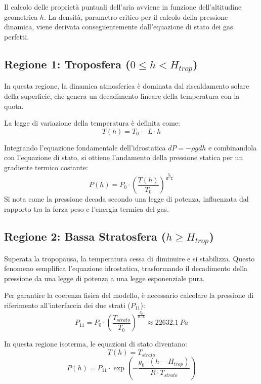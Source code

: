 \documentclass[12pt,a4paper]{article}
\begin{document}
Il calcolo delle proprietà puntuali dell'aria avviene in funzione dell'altitudine geometrica $h$. La densità, parametro critico per il calcolo della pressione dinamica, viene derivata conseguentemente dall'equazione di stato dei gas perfetti.

\subsection{Regione 1: Troposfera ($0 \le h < H_{trop}$)}
In questa regione, la dinamica atmosferica è dominata dal riscaldamento solare della superficie, che genera un decadimento lineare della temperatura con la quota. 

La legge di variazione della temperatura è definita come:
\begin{equation}
    T(h) = T_0 - L \cdot h
\end{equation}

Integrando l'equazione fondamentale dell'idrostatica $dP = -\rho g dh$ e combinandola con l'equazione di stato, si ottiene l'andamento della pressione statica per un gradiente termico costante:
\begin{equation}
    P(h) = P_0 \cdot \left( \frac{T(h)}{T_0} \right)^{\frac{g_0}{R \cdot L}}
\end{equation}
Si nota come la pressione decada secondo una legge di potenza, influenzata dal rapporto tra la forza peso e l'energia termica del gas.

\subsection{Regione 2: Bassa Stratosfera ($h \ge H_{trop}$)}
Superata la tropopausa, la temperatura cessa di diminuire e si stabilizza. Questo fenomeno semplifica l'equazione idrostatica, trasformando il decadimento della pressione da una legge di potenza a una legge esponenziale pura.

Per garantire la coerenza fisica del modello, è necessario calcolare la pressione di riferimento all'interfaccia dei due strati ($P_{11}$):
\begin{equation}
    P_{11} = P_0 \cdot \left( \frac{T_{strato}}{T_0} \right)^{\frac{g_0}{R \cdot L}} \approx \SI{22632.1}{Pa}
\end{equation}

In questa regione isoterma, le equazioni di stato diventano:
\begin{equation}
    T(h) = T_{strato}
\end{equation}
\begin{equation}
    P(h) = P_{11} \cdot \exp\left( -\frac{g_0 \cdot (h - H_{trop})}{R \cdot T_{strato}} \right)
\end{equation}
\end{document}

